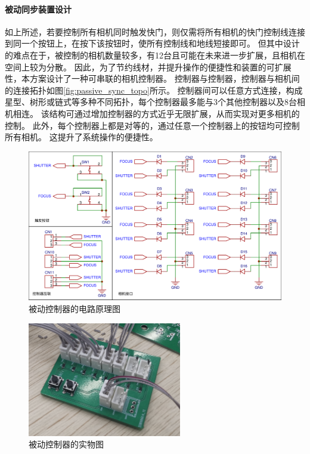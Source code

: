 \paragraph{被动同步装置设计}
如上所述，若要控制所有相机同时触发快门，则仅需将所有相机的快门控制线连接到同一个按钮上，在按下该按钮时，使所有控制线和地线短接即可。
但其中设计的难点在于，被控制的相机数量较多，有12台且可能在未来进一步扩展，且相机在空间上较为分散。
因此，为了节约线材，并提升操作的便捷性和装置的可扩展性，本方案设计了一种可串联的相机控制器。
控制器与控制器，控制器与相机间的连接拓扑如图\ref{fig:passive_sync_topo}所示。
控制器间可以任意方式连接，构成星型、树形或链式等多种不同拓扑，每个控制器最多能与3个其他控制器以及8台相机相连。
该结构可通过增加控制器的方式近乎无限扩展，从而实现对更多相机的控制。
此外，每个控制器上都是对等的，通过任意一个控制器上的按钮均可控制所有相机。
这提升了系统操作的便捷性。

\begin{figure}
\includegraphics[width=\textwidth]{figures/passive_sync_schematic}
\caption{被动控制器的电路原理图}
\label{fig:passive_sync_schematic}
\end{figure}

\begin{figure}
\centering
\includegraphics[height=5cm]{figures/passive_sync_controller}
\caption{被动控制器的实物图}
\end{figure}

